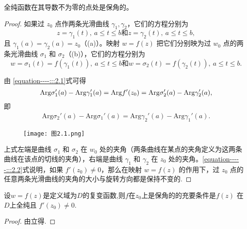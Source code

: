 \documentclass[../../main.tex]{subfiles}
\begin{document}
\begin{theorem}\label{theorem:全纯函数在其导数不为零的点处是保角的}
全纯函数在其导数不为零的点处是保角的。
\end{theorem}
\begin{proof}
如果过 \( z_0 \) 点作两条光滑曲线 \( \gamma_1, \gamma_2 \)，它们的方程分别为  
\[ z = \gamma_1(t),\ a \leqslant t \leqslant b \text{和}  
z = \gamma_2(t),\ a \leqslant t \leqslant b, \]  
且 \( \gamma_1(a) = \gamma_2(a) = z_0 \)（(a)）。映射 \( w = f(z) \) 把它们分别映为过 \( w_0 \) 点的两条光滑曲线 \( \sigma_1 \) 和 \( \sigma_2 \)（(b)），它们的方程分别为  
\[ w = \sigma_1(t) = f(\gamma_1(t)),\ a \leqslant t \leqslant b \text{和} w = \sigma_2(t) = f(\gamma_2(t)),\ a \leqslant t \leqslant b. \]  

由 \eqref{equation----:::2.1}式可得  
\begin{align}
\mathrm{Arg} \sigma_1'(a) - \mathrm{Arg} \gamma_1'(a) = \mathrm{Arg} f'(z_0) \notag = \mathrm{Arg} \sigma_2'(a) - \mathrm{Arg} \gamma_2'(a), \notag
\end{align}
即  
\begin{align}
\mathrm{Arg} \sigma_2'(a) - \mathrm{Arg} \sigma_1'(a) = \mathrm{Arg} \gamma_2'(a) - \mathrm{Arg} \gamma_1'(a). \label{equation-----:::2.2}
\end{align}
\begin{figure}[H]
\centering
\texttt{[image: 
图2.1.png]}
\caption{}
\label{figure:image-图2.1}
\end{figure}
上式左端是曲线 \( \sigma_1 \) 和 \( \sigma_2 \) 在 \( w_0 \) 处的夹角（两条曲线在某点的夹角定义为这两条曲线在该点的切线的夹角），右端是曲线 \( \gamma_1 \) 和 \( \gamma_2 \) 在 \( z_0 \) 处的夹角。\eqref{equation-----:::2.2}式说明，如果 \( f'(z_0) \neq 0 \)，那么在映射 \( w = f(z) \) 的作用下，过 \( z_0 \) 点的任意两条光滑曲线的夹角的大小与旋转方向都是保持不变的.
\end{proof}

\begin{corollary}
设\( w = f(z) \)是定义域为$D$的复变函数,则$f$在$z_0$上是保角的的充要条件是\( f(z) \) 在$D$上全纯且 \( f'(z_0) \neq 0 \).
\end{corollary}
\begin{proof}
由立得.
\end{proof}
\end{document}
